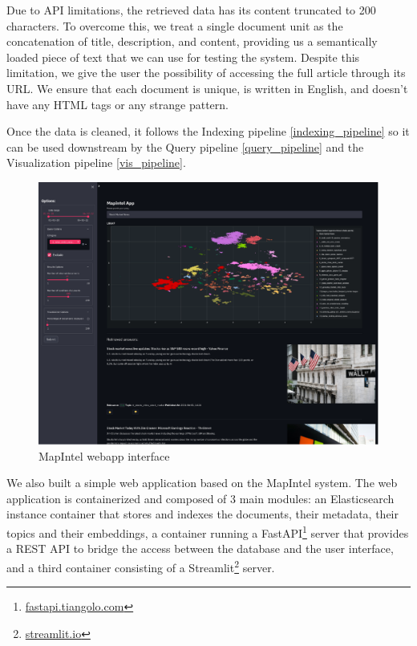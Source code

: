 \documentclass[a4paper]{article}
\begin{document}
Due to API limitations, the retrieved data has its content truncated to 200 characters. To overcome this, we treat a single document unit as the concatenation of title, description, and content, providing us a semantically loaded piece of text that we can use for testing the system. Despite this limitation, we give the user the possibility of accessing the full article through its URL. We ensure that each document is unique, is written in English, and doesn't have any HTML tags or any strange pattern.

Once the data is cleaned, it follows the Indexing pipeline \ref{indexing_pipeline} so it can be used downstream by the Query pipeline \ref{query_pipeline} and the Visualization pipeline \ref{vis_pipeline}. 

\begin{figure}[H]
  \centering
  \includegraphics[scale=0.6]{./assets/ui_screenshot}
  \caption{MapIntel webapp interface}
  \label{app_ui}
\end{figure}

We also built a simple web application based on the MapIntel system. The web application is containerized and composed of 3 main modules: an Elasticsearch instance container that stores and indexes the documents, their metadata, their topics and their embeddings, a container running a FastAPI\footnote{\href{https://fastapi.tiangolo.com/}{fastapi.tiangolo.com}} server that provides a REST API to bridge the access between the database and the user interface, and a third container consisting of a Streamlit\footnote{\href{https://streamlit.io/}{streamlit.io}} server.
\end{document}
